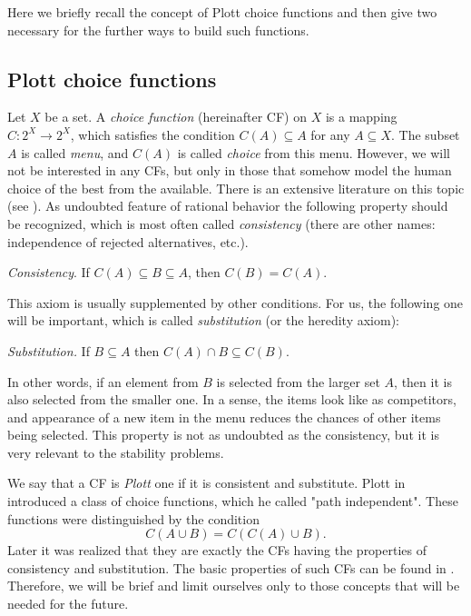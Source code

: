\documentclass[12pt,a4paper]{article}
\begin{document}
Here we briefly recall the concept of  Plott choice functions and then give two necessary for the further ways to build such functions.

\subsection{Plott choice functions}

Let $X$ be a set. A \emph{choice function} (hereinafter CF) on $X$ is a mapping $C:2^X\to 2^X$, which satisfies the condition $C(A)\subseteq A$ for any $A\subseteq X$. The subset $A$ is called \emph{menu}, and $C(A)$ is called \emph{choice} from this menu. However, we will not be interested in any CFs, but only in those that somehow model the human choice of the best from the available. There is an extensive literature on this topic (see \cite{AA}). As undoubted feature of rational behavior the following property should be recognized, which is most often called \emph{consistency} (there are other names: independence of rejected alternatives, etc.).\medskip

\emph{Consistency}. If $C(A)\subseteq B\subseteq A$, then $C(B)=C(A)$. \medskip

This axiom is usually supplemented by other conditions. For us, the following one will be important, which is called \emph{substitution} (or the heredity axiom): \medskip

\emph{Substitution.} If $B\subseteq A$ then $C(A)\cap B\subseteq C(B)$. \medskip

In other words, if an element from $B$ is selected from the larger set $A$, then it is also selected from the smaller one. In a sense, the items look like as competitors, and appearance of a new item in the menu reduces the chances of other items being selected. This property is not as undoubted as the consistency, but it is very relevant to the stability problems.

We say that a CF is \emph{Plott} one if it is consistent and substitute.
Plott in \cite{P} introduced a class of choice functions, which he called "path independent". These functions were distinguished by the condition
\begin{equation}\label{Plo}
                                 C(A\cup B)=C(C(A)\cup B).                 \end{equation}
Later it was realized that they are exactly the CFs having the properties of
consistency and substitution. The basic properties of such CFs can be found in \cite{AA, M, DK}. Therefore, we will be brief and limit ourselves only to those concepts that will be needed for the future.
\end{document}
